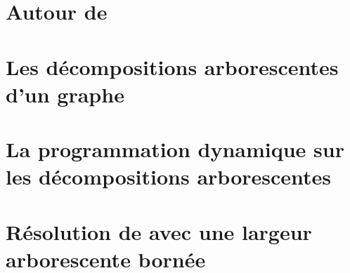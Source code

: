 
\tableofcontents

\clearpage



\chapter{Autour de \hcycle}
\label{about_hcycle}


\chapter{Les décompositions arborescentes d'un graphe}
\label{treewidth}


\chapter{La programmation dynamique sur les décompositions arborescentes}
\label{progdyn}


\chapter{Résolution de \hcycle avec une largeur arborescente bornée}
\label{hcycle_tw}


